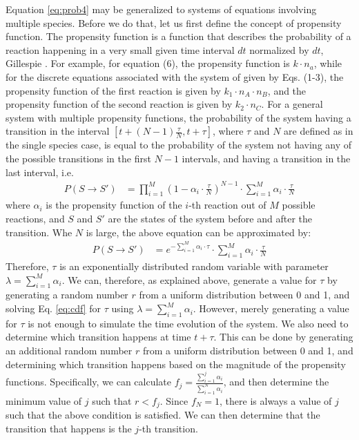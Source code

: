 \documentclass[12pt]{article}
\begin{document}
Equation \ref{eq:prob4} may be generalized to systems of equations involving multiple species. Before we do that, let us first define the concept of propensity function. The propensity function is a function that describes the probability of a reaction happening in a very small given time interval $dt$ normalized by $dt$, Gillespie \cite{Gillespie2007}. For example, for equation (6), the propensity function is $k \cdot n_a$, while for the discrete equations associated with the system of  given by Eqs. (1-3), the propensity function of the first reaction is given by $k_1 \cdot n_A \cdot n_B$, and the propensity function of the second reaction is given by $k_2 \cdot n_C$.  For a general system with multiple propensity functions, the probability of the system having a transition in the interval $[t+(N-1)\frac \tau N,t+\tau]$, where $\tau$ and $N$ are defined as in the single species case, is equal to the probability of the system not having any of the possible transitions in the first $N-1$ intervals, and having a transition in the last interval, i.e.
\begin{align}
P(S \rightarrow S') &= \prod_{i=1}^{M} (1-\alpha_i \cdot \frac \tau N)^{N-1} \cdot \sum_{i=1}^{M}\alpha_i \cdot \frac \tau N
\label{eq:prob5}
\end{align}
where $\alpha_i$ is the propensity function of the $i$-th reaction out of $M$ possible reactions, and $S$ and $S'$ are the states of the system before and after the transition.  Whe $N$ is large, the above equation can be approximated by:
\begin{align}
P(S \rightarrow S') &= e^{-\sum_{i=1}^{M}\alpha_i \cdot \tau} \cdot \sum_{i=1}^{M}\alpha_i \cdot \frac \tau N
\label{eq:prob6}
\end{align}
Therefore, $\tau$ is an exponentially distributed random variable with parameter $\lambda = \sum_{i=1}^{M}\alpha_i$.  We can, therefore, as explained above, generate a value for $\tau$ by generating a random number $r$ from a uniform distribution between 0 and 1, and solving Eq. \ref{eq:cdf} for $\tau$ using $\lambda=\sum_{i=1}^{M}\alpha_i$. However, merely generating a value for $\tau$ is not enough to simulate the time evolution of the system. We also need to determine which transition happens at time $t+\tau$. This can be done by generating an additional random number $r$ from a uniform distribution between 0 and 1, and determining which transition happens based on the magnitude of the propensity functions. Specifically, we can calculate $f_j=\frac {\sum_{i=1}^{j}\alpha_i} {\sum_{i=1}^N \alpha_i}$, and then determine the minimum value of $j$ such that $r<f_j$. Since $f_N=1$, there is always a value of $j$ such that the above condition is satisfied.  We can then determine that the transition that happens is the $j$-th transition. 
\end{document}
